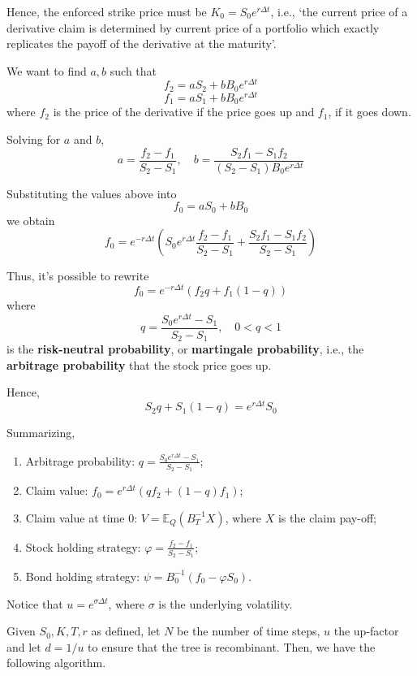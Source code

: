 Hence, the enforced strike price must be $K_0 = S_0 e^{r \Delta t}$, i.e., `the current price of a derivative claim is determined by current price of a portfolio which exactly replicates the payoff of the derivative at the maturity'.

We want to find $a, b$ such that 
\[
    f_2 = a S_2 + b B_0 e^{r \Delta t}
\]
\[
    f_1 = a S_1 + b B_0 e^{r \Delta t}
\]
where $f_2$ is the price of the derivative if the price goes up and $f_1$, if it goes down. 

Solving for $a$ and $b$,
\[
    a = \frac{f_2 - f_1}{S_2 - S_1}, \quad b= \frac{S_2 f_1 - S_1 f_2}{(S_2 - S_1) B_0 e^{r \Delta t}}
\]

Substituting the values above into
\[
    f_0 = a S_0 + b B_0
\]
we obtain
\[
    f_0 = e^{-r \Delta t} \left( S_0 e^{r \Delta t} \frac{f_2 - f_1}{S_2 - S_1} + \frac{S_2 f_1 - S_1 f_2}{S_2 - S_1} \right)
\]

Thus, it's possible to rewrite
\[
    f_0 = e^{-r \Delta t}(f_2 q + f_1(1-q))
\]
where 
\[
    q = \frac{S_0 e^{r \Delta t} - S_1}{S_2 - S_1}, \quad 0 < q < 1
\]
is the \textbf{risk-neutral probability}, or \textbf{martingale probability}, i.e., the \textbf{arbitrage probability} that the stock price goes up. 

Hence,
\[
    S_2 q + S_1 (1-q) = e^{r \Delta t} S_0
\]

\begin{theorem} 
    Summarizing, 
    \begin{enumerate}
        \item Arbitrage probability: $q = \frac{S_0 e^{r \Delta t} - S_1}{S_2 - S_1}$;
        \item Claim value: $f_0 = e^{r \Delta t} (q f_2 + (1-q) f_1)$;
        \item Claim value at time $0$: $V = \mathbb{E}_Q (B_T^{-1} X)$, where $X$ is the claim pay-off;
        \item Stock holding strategy: $\varphi = \frac{f_2 - f_1}{S_2 - S_1}$;
        \item Bond holding strategy: $\psi = B_0^{-1}(f_0 - \varphi S_0)$.
    \end{enumerate}
\end{theorem}

Notice that $u = e^{\sigma \Delta t}$, where $\sigma$ is the underlying volatility.

Given $S_0, K, T, r$ as defined, let $N$ be the number of time steps, $u$ the up-factor and let $d = 1/u$ to ensure that the tree is recombinant. Then, we have the following algorithm.

